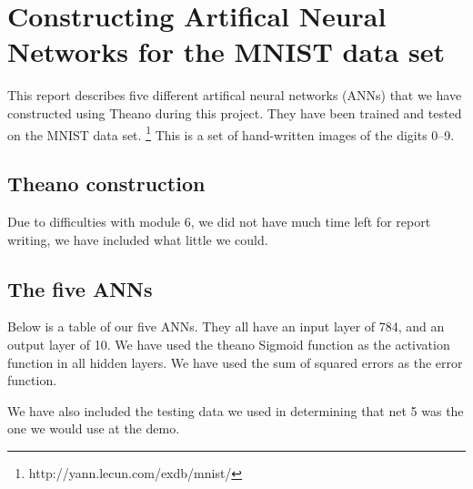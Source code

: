 
\section{Constructing Artifical Neural Networks for the MNIST data set}
This report describes five different artifical neural networks (ANNs)
that we have constructed using Theano during this project. They have
been trained and tested on the MNIST data set.
\footnote{http://yann.lecun.com/exdb/mnist/} This is a set of
hand-written images of the digits 0--9.

\subsection{Theano construction}

Due to difficulties with module 6, we did not have much time left for report
writing, we have included what little we could.

\subsection{The five ANNs}


Below is a table of our five ANNs. They all have an input layer of 784, and
an output layer of 10. We have used the theano Sigmoid function as the
activation function in all hidden layers. We have used the sum of squared
errors as the error function.

We have also included the testing data we used in determining that net 5
was the one we would use at the demo.


